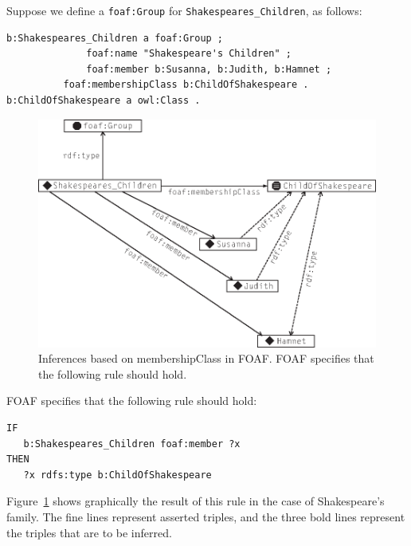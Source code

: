 Suppose we define a \texttt{foaf:Group} for \texttt{Shakespeares\_Children}, as follows:

\begin{lstlisting}
b:Shakespeares_Children a foaf:Group ;
              foaf:name "Shakespeare's Children" ;
              foaf:member b:Susanna, b:Judith, b:Hamnet ;
	      foaf:membershipClass b:ChildOfShakespeare .
b:ChildOfShakespeare a owl:Class .
\end{lstlisting}


\begin{figure}
\centering
\includegraphics[width=5in]{media/ch12/f12-11.eps}
\caption{Inferences based on membershipClass in FOAF. FOAF specifies that the
following rule should hold.}
\label{fig:ch12.11}
\end{figure}


FOAF specifies that the following rule should hold: 

\begin{lstlisting}
IF
   b:Shakespeares_Children foaf:member ?x
THEN
   ?x rdfs:type b:ChildOfShakespeare
\end{lstlisting}

Figure~\ref{fig:ch12.11} shows graphically the result of this rule in the case of
Shakespeare's family. The fine lines represent asserted triples, and the
three bold lines represent the triples that are to be inferred.



